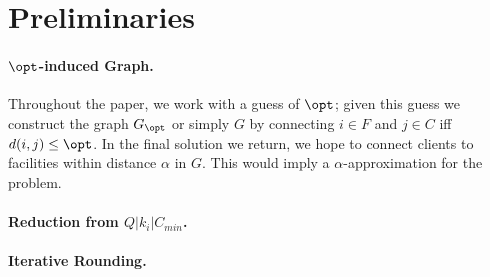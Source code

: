 \section{Preliminaries}
\paragraph{$\opt$-induced Graph.}
Throughout the paper, we work with a guess of $\opt$; given this guess we construct the graph $G_\opt$ or simply $G$ 
by connecting $i\in F$ and $j\in C$ iff $d(i,j)\leq \opt$. In the final solution we return, we hope to connect clients to facilities within
distance $\alpha$ in $G$. This would imply a $\alpha$-approximation for the \mckc problem.

\paragraph{Reduction from $Q|k_i|C_{min}$.}

\paragraph{Iterative Rounding.}


\newpage